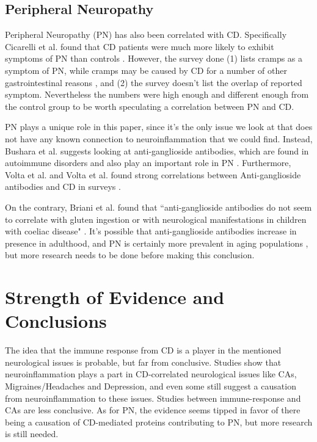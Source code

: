 \documentclass{article}
\begin{document}
\subsection{Peripheral Neuropathy}

Peripheral Neuropathy (PN) has also been correlated with CD. Specifically Cicarelli et al. found that CD patients were much more likely to exhibit symptoms of PN than controls \cite{Cicarelli}. However, the survey done (1) lists cramps as a symptom of PN, while cramps may be caused by CD for a number of other gastrointestinal reasons \cite{Hourigan}, and (2) the survey doesn't list the overlap of reported symptom. Nevertheless the numbers were high enough and different enough from the control group to be worth speculating a correlation between PN and CD. 

PN plays a unique role in this paper, since it's the only issue we look at that does not have any known connection to neuroinflammation that we could find. Instead, Bushara et al. suggests looking at anti-ganglioside antibodies, which are found in autoimmune disorders and also play an important role in PN \cite{Bushara}. Furthermore, Volta et al. and Volta et al. found strong correlations between Anti-ganglioside antibodies and CD in surveys \cite{Volta,Volta2}. 

On the contrary, Briani et al. found that ``anti-ganglioside antibodies do not seem to correlate with gluten ingestion or with neurological manifestations in children with coeliac disease" \cite{Briani}. It's possible that anti-ganglioside antibodies increase in presence in adulthood, and PN is certainly more prevalent in aging populations \cite{Barrell}, but more research needs to be done before making this conclusion. 

\section{Strength of Evidence and Conclusions}

The idea that the immune response from CD is a player in the mentioned neurological issues is probable, but far from conclusive. Studies show that neuroinflammation plays a part in CD-correlated neurological issues like CAs, Migraines/Headaches and Depression, and even some still suggest a causation from neuroinflammation to these issues. Studies between immune-response and CAs are less conclusive.  As for PN, the evidence seems tipped in favor of there being a causation of CD-mediated proteins contributing to PN, but more research is still needed.
\end{document}
